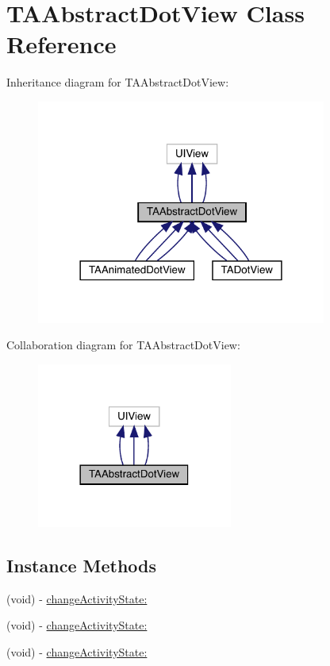 \hypertarget{interface_t_a_abstract_dot_view}{}\section{T\+A\+Abstract\+Dot\+View Class Reference}
\label{interface_t_a_abstract_dot_view}


Inheritance diagram for T\+A\+Abstract\+Dot\+View\+:\nopagebreak
\begin{figure}[H]
\begin{center}
\leavevmode
\includegraphics[width=270pt]{interface_t_a_abstract_dot_view__inherit__graph}
\end{center}
\end{figure}


Collaboration diagram for T\+A\+Abstract\+Dot\+View\+:\nopagebreak
\begin{figure}[H]
\begin{center}
\leavevmode
\includegraphics[width=182pt]{interface_t_a_abstract_dot_view__coll__graph}
\end{center}
\end{figure}
\subsection*{Instance Methods}
\begin{DoxyCompactItemize}
\item 
(void) -\/ \mbox{\hyperlink{interface_t_a_abstract_dot_view_a980afa16977f7956129faeb494dfc760}{change\+Activity\+State\+:}}
\item 
(void) -\/ \mbox{\hyperlink{interface_t_a_abstract_dot_view_a980afa16977f7956129faeb494dfc760}{change\+Activity\+State\+:}}
\item 
(void) -\/ \mbox{\hyperlink{interface_t_a_abstract_dot_view_a980afa16977f7956129faeb494dfc760}{change\+Activity\+State\+:}}
\end{DoxyCompactItemize}


